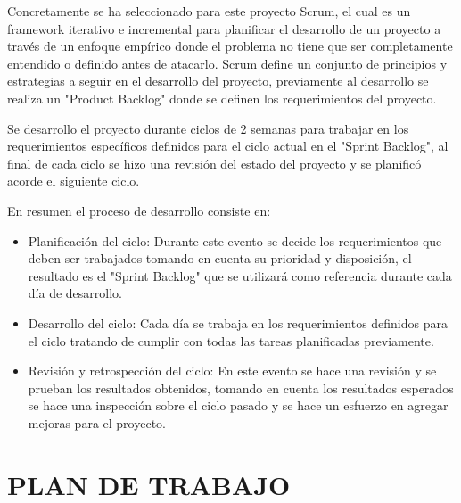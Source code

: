 \documentclass[12pt]{report}
\begin{document}
Concretamente se ha seleccionado para este proyecto Scrum, el cual es un framework iterativo e incremental para planificar el desarrollo de un proyecto a través de un enfoque empírico donde el problema no tiene que ser completamente entendido o definido antes de atacarlo. Scrum define un conjunto de principios y estrategias a seguir en el desarrollo del proyecto, previamente al desarrollo se realiza un "Product Backlog" donde se definen los requerimientos del proyecto.

Se desarrollo el proyecto durante ciclos de 2 semanas para trabajar en los requerimientos específicos definidos para el ciclo actual en el "Sprint Backlog", al final de cada ciclo se hizo una revisión del estado del proyecto y se planificó acorde el siguiente ciclo.

En resumen el proceso de desarrollo consiste en:

\begin{itemize}
\setlength\itemsep{0pt}

\item Planificación del ciclo: Durante este evento se decide los requerimientos que deben ser trabajados tomando en cuenta su prioridad y disposición, el resultado es el "Sprint Backlog" que se utilizará como referencia durante cada día de desarrollo.
\item Desarrollo del ciclo: Cada día se trabaja en los requerimientos definidos para el ciclo tratando de cumplir con todas las tareas planificadas previamente.
\item Revisión y retrospección del ciclo: En este evento se hace una revisión y se prueban los resultados obtenidos, tomando en cuenta los resultados esperados se hace una inspección sobre el ciclo pasado y se hace un esfuerzo en agregar mejoras para el proyecto.

\end{itemize}

\break



\section[Plan de Trabajo]{PLAN DE TRABAJO}
\end{document}
